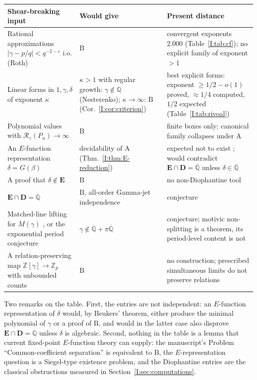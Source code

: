 \documentclass[11pt,a4paper]{article}
\newcommand{\Q}{\mathbb Q}
\newcommand{\Z}{\mathbb Z}
\newcommand{\Qbar}{\overline{\mathbb Q}}
\newcommand{\EE}{\mathbf E}
\newcommand{\DD}{\mathbf D}
\theoremstyle{definition}
\theoremstyle{remark}
\numberwithin{equation}{section}
\begin{document}
\begin{center}\small
\begin{tabularx}{\linewidth}{@{}p{.27\linewidth}p{.30\linewidth}X@{}}
\toprule
Shear-breaking input & Would give & Present distance\\
\midrule
Rational approximations $|\gamma-p/q|<q^{-2-\varepsilon}$ i.o. (Roth) & $\mathrm B$ &
convergent exponents $2.000$ (Table~\ref{I:tab:cf}); no explicit family of exponent $>1$
\cite[Parts~I--III]{M}\\
Linear forms in $1,\gamma,\delta$ of exponent $\kappa$ & $\kappa>1$ with regular
growth: $\gamma\notin\Q$ (Nesterenko); $\kappa\to\infty$: $\mathrm B$
(Cor.~\ref{I:cor:criterion}) &
best explicit forms: exponent $\ge1/2-o(1)$ proved, $\approx1/4$ computed, $1/2$
expected (Table~\ref{I:tab:rivoal})\\
Polynomial values with $\mathcal R_\gamma(P_n)\to\infty$ \cite[Thm.~``Equivalent
infinite-family target'']{M} & $\mathrm B$ & finite boxes only; canonical family collapses
under $\mathrm A$\\
An $E$-function representation $\delta=G(\beta)$ & decidability of $\mathrm A$
(Thm.~\ref{I:thm:E-reduction}) & expected not to exist \cite{Rivoal2017}; would contradict
$\EE\cap\DD=\Qbar$ unless $\delta\in\Qbar$\\
A proof that $\delta\notin\EE$ & $\mathrm B$ & no non-Diophantine tool
\cite{FRliouville}\\
$\EE\cap\DD=\Qbar$ \cite{FRmixed} & $\mathrm B$, all-order Gamma-jet independence
\cite{K002} & conjecture\\
Matched-line lifting for $M(\gamma)$ \cite{K002}, or the exponential period conjecture
\cite{FJ} & $\gamma\notin\Qbar+\pi\Qbar$ & conjecture; motivic non-splitting is a theorem,
its period-level content is not\\
A relation-preserving map $\Z[\gamma]\to\Z_p$ with unbounded counts \cite[Parts~VI--VII]{M}
& $\mathrm B$ & no construction; prescribed simultaneous limits do not preserve
relations\\
\bottomrule
\end{tabularx}
\end{center}

Two remarks on the table. First, the entries are not independent: an $E$-function
representation of $\delta$ would, by Beukers' theorem, either produce the minimal
polynomial of $\gamma$ or a proof of $\mathrm B$, and would in the latter case also
disprove $\EE\cap\DD=\Qbar$ unless $\delta$ is algebraic. Second, nothing in the table
is a lemma that current fixed-point $E$-function theory can supply: the manuscript's
Problem ``Common-coefficient separation'' \cite{K002} is equivalent to $\mathrm B$, the
$E$-representation question is a Siegel-type existence problem, and the Diophantine
entries are the classical obstructions measured in Section~\ref{I:sec:computations}.
\end{document}
